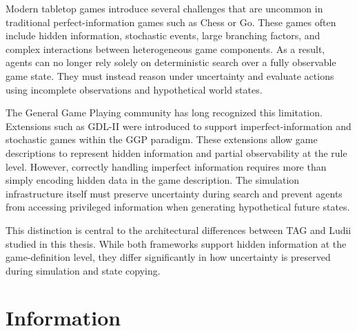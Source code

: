 Modern tabletop games introduce several challenges that are uncommon in traditional perfect-information games such as Chess or Go. These games often include hidden information, stochastic events, large branching factors, and complex interactions between heterogeneous game components. As a result, agents can no longer rely solely on deterministic search over a fully observable game state. They must instead reason under uncertainty and evaluate actions using incomplete observations and hypothetical world states.

The General Game Playing community has long recognized this limitation. Extensions such as GDL-II were introduced to support imperfect-information and stochastic games within the GGP paradigm\cite{Genesereth2005GeneralGP}. These extensions allow game descriptions to represent hidden information and partial observability at the rule level. However, correctly handling imperfect information requires more than simply encoding hidden data in the game description. The simulation infrastructure itself must preserve uncertainty during search and prevent agents from accessing privileged information when generating hypothetical future states.

This distinction is central to the architectural differences between TAG and Ludii studied in this thesis. While both frameworks support hidden information at the game-definition level, they differ significantly in how uncertainty is preserved during simulation and state copying.

\section{Information}

